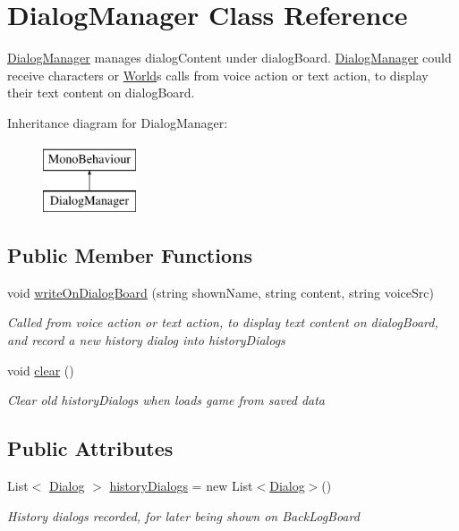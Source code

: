 \hypertarget{class_dialog_manager}{}\section{Dialog\+Manager Class Reference}
\label{class_dialog_manager}


\hyperlink{class_dialog_manager}{Dialog\+Manager} manages dialog\+Content under dialog\+Board. \hyperlink{class_dialog_manager}{Dialog\+Manager} could receive characters\textquotesingle{} or \hyperlink{class_world}{World}\textquotesingle{}s calls from voice action or text action, to display their text content on dialog\+Board.  


Inheritance diagram for Dialog\+Manager\+:\begin{figure}[H]
\begin{center}
\leavevmode
\includegraphics[height=2.000000cm]{class_dialog_manager}
\end{center}
\end{figure}
\subsection*{Public Member Functions}
\begin{DoxyCompactItemize}
\item 
void \hyperlink{class_dialog_manager_a4699c45424df9dcb63b9b2dda98554ad}{write\+On\+Dialog\+Board} (string shown\+Name, string content, string voice\+Src)
\begin{DoxyCompactList}\small\item\em Called from voice action or text action, to display text content on dialog\+Board, and record a new history dialog into history\+Dialogs \end{DoxyCompactList}\item 
void \hyperlink{class_dialog_manager_ae3a45e59a6021bbc9361e903fe61037e}{clear} ()
\begin{DoxyCompactList}\small\item\em Clear old history\+Dialogs when loads game from saved data \end{DoxyCompactList}\end{DoxyCompactItemize}
\subsection*{Public Attributes}
\begin{DoxyCompactItemize}
\item 
List$<$ \hyperlink{class_dialog}{Dialog} $>$ \hyperlink{class_dialog_manager_a77ed2b79b0cc521e693446b510087b80}{history\+Dialogs} = new List$<$\hyperlink{class_dialog}{Dialog}$>$()
\begin{DoxyCompactList}\small\item\em History dialogs recorded, for later being shown on Back\+Log\+Board \end{DoxyCompactList}\end{DoxyCompactItemize}


